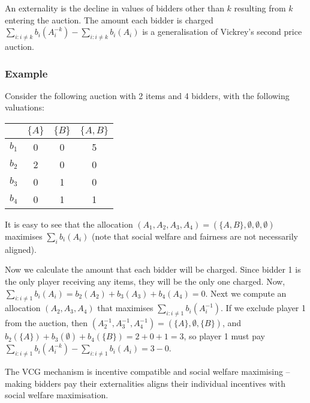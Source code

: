 An externality is the decline in values of bidders other than $k$ resulting
from $k$ entering the auction. The amount each bidder is charged $\sum_{i: i
\neq k} b_i(A_i^{-k}) - \sum_{i: i \neq k} b_i(A_i)$ is a generalisation of
Vickrey's second price auction.

\subsubsection{Example}

Consider the following auction with 2 items and 4 bidders, with the following
valuations:

\begin{center}
	\begin{tabular}{|c|c|c|c|}
		\hline
		& $\{A\}$ & $\{B\}$ & $\{A,B\}$ \\ \hline
		$b_1$ & 0 & 0 & 5 \\ 
		$b_2$ & 2 & 0 & 0 \\ 
		$b_3$ & 0 & 1 & 0 \\ 
		$b_4$ & 0 & 1 & 1 \\ \hline
	\end{tabular}
\end{center}

It is easy to see that the allocation $(A_1, A_2, A_3, A_4) = (\{A,B\},
\emptyset, \emptyset, \emptyset)$ maximises $\sum_i b_i(A_i)$ (note that social
welfare and fairness are not necessarily aligned).

Now we calculate the amount that each bidder will be charged.  Since bidder 1
is the only player receiving any items, they will be the only one charged. Now,
$\sum_{i: i \neq 1} b_i(A_i) = b_2(A_2) + b_3(A_3) + b_4(A_4) = 0$. Next we
compute an allocation $(A_2, A_3, A_4)$ that maximises $\sum_{i: i \neq 1}
b_i(A_i^{-1})$. If we exclude player 1 from the auction, then $(A_2^{-1},
A_3^{-1}, A_4^{-1}) = (\{A\}, \emptyset, \{B\})$, and $b_2(\{A\}) +
b_3(\emptyset) + b_4(\{B\}) = 2+0+1 = 3$, so player 1 must pay $\sum_{i: i \neq
1} b_i(A_i^{-k}) - \sum_{i: i \neq 1} b_i(A_i) = 3 - 0$.

\begin{theorem}
	The VCG mechanism is incentive compatible and social welfare maximising --
	making bidders pay their externalities aligns their individual incentives
	with social welfare maximisation.
\end{theorem}

